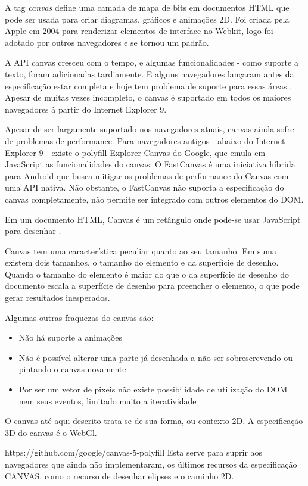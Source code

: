 \documentclass[
12pt,
a4paper,
portuges,
draft
]{report}
\begin{document}
A tag \textit{canvas} define uma camada de mapa de bits em documentos
HTML que pode ser usada para criar diagramas, gráficos e animações
2D. Foi criada pela Apple em 2004 para renderizar elementos de interface
no Webkit, logo foi adotado por outros navegadores e se tornou um
padrão.

A API canvas cresceu com o tempo, e algumas funcionalidades - como
suporte a texto, foram adicionadas tardiamente. E alguns navegadores
lançaram antes da especificação estar completa e hoje tem problema
de suporte para essas áreas \autocite{diveIntohtml}. Apesar de muitas
vezes incompleto, o canvas é suportado em todos os maiores navegadores
à partir do Internet Explorer 9.

Apesar de ser largamente suportado nos navegadores atuais, canvas ainda
sofre de problemas de performance. Para navegadores antigos - abaixo do
Internet Explorer 9 - existe o polyfill Explorer Canvas do Google, que
emula em JavaScript as funcionalidades do canvas. O FastCanvas é uma
iniciativa híbrida para Android que busca mitigar os problemas de
performance do Canvas com uma API nativa. Não obstante, o FastCanvas
não suporta a especificação do canvas completamente, não permite ser
integrado com outros elementos do DOM.

Em um documento HTML, Canvas é um retângulo onde pode-se usar
JavaScript para desenhar \autocite[pp. 113]{diveIntohtml}.

Canvas tem uma característica peculiar quanto ao seu tamanho.
Em suma existem dois tamanhos, o tamanho do elemento e da superfície de
desenho. Quando o tamanho do elemento é maior do que o da superfície
de desenho do documento escala a superfície de desenho para preencher o
elemento, o que pode gerar resultados inesperados.

Algumas outras fraquezas do canvas são:
\begin{itemize}
\item{Não há suporte a animações}
\item{Não é possível alterar uma parte já desenhada a não ser sobrescrevendo ou pintando o canvas novamente}
\item{Por ser um vetor de pixeis não existe possibilidade de utilização do DOM nem seus eventos, limitado muito a iteratividade}
\end{itemize}

O canvas até aqui descrito trata-se de sua forma, ou contexto 2D. A
especificação 3D do canvas é o WebGl.

https://github.com/google/canvas-5-polyfill Esta serve para
suprir aos navegadores que ainda não implementaram, os últimos recursos
da especificação CANVAS, como o recurso de desenhar elipses e o caminho 2D.
\end{document}
